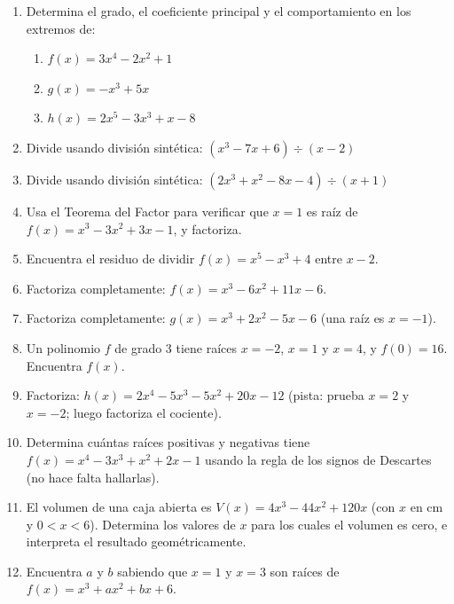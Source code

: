 \documentclass[12pt, letterpaper]{article}
\begin{document}
\begin{enumerate}[resume=ejercicios, leftmargin=*]
  \item \facil{} Determina el grado, el coeficiente principal y el comportamiento en los extremos de:
        \begin{enumerate}[label=\alph*)]
          \item $f(x) = 3x^4 - 2x^2 + 1$
          \item $g(x) = -x^3 + 5x$
          \item $h(x) = 2x^5 - 3x^3 + x - 8$
        \end{enumerate}

  \item \facil{} Divide usando división sintética: $(x^3 - 7x + 6) \div (x - 2)$

  \item \facil{} Divide usando división sintética: $(2x^3 + x^2 - 8x - 4) \div (x + 1)$

  \item \facil{} Usa el Teorema del Factor para verificar que $x = 1$ es raíz de $f(x) = x^3 - 3x^2 + 3x - 1$, y factoriza.

  \item \medio{} Encuentra el residuo de dividir $f(x) = x^5 - x^3 + 4$ entre $x - 2$.

  \item \medio{} Factoriza completamente: $f(x) = x^3 - 6x^2 + 11x - 6$.

  \item \medio{} Factoriza completamente: $g(x) = x^3 + 2x^2 - 5x - 6$ (una raíz es $x = -1$).

  \item \medio{} Un polinomio $f$ de grado 3 tiene raíces $x = -2$, $x = 1$ y $x = 4$, y $f(0) = 16$. Encuentra $f(x)$.

  \item \dificil{} Factoriza: $h(x) = 2x^4 - 5x^3 - 5x^2 + 20x - 12$ (pista: prueba $x = 2$ y $x = -2$; luego factoriza el cociente).

  \item \dificil{} Determina cuántas raíces positivas y negativas tiene $f(x) = x^4 - 3x^3 + x^2 + 2x - 1$ usando la regla de los signos de Descartes (no hace falta hallarlas).

  \item \dificil{} El volumen de una caja abierta es $V(x) = 4x^3 - 44x^2 + 120x$ (con $x$ en cm y $0 < x < 6$). Determina los valores de $x$ para los cuales el volumen es cero, e interpreta el resultado geométricamente.

  \item \dificil{} Encuentra $a$ y $b$ sabiendo que $x = 1$ y $x = 3$ son raíces de $f(x) = x^3 + ax^2 + bx + 6$.
\end{enumerate}
\end{document}

